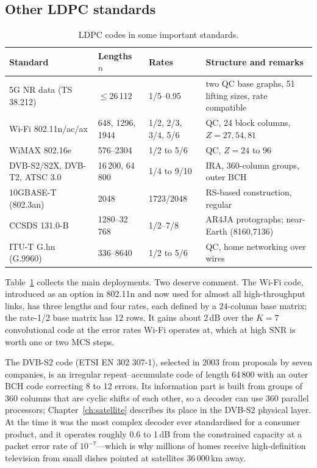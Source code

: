 \subsection{Other LDPC standards}

\begin{table}[htbp]\centering\small
\caption{LDPC codes in some important standards.}
\label{tab:ch15:ldpcstd}
\footnotesize
\begin{tabularx}{\linewidth}{@{}l l l >{\raggedright\arraybackslash}X@{}}
\toprule
Standard & Lengths $n$ & Rates & Structure and remarks\\
\midrule
5G NR data (TS 38.212) & $\le$26\,112 & 1/5--0.95 & two QC base graphs, 51 lifting sizes, rate compatible\\
Wi-Fi 802.11n/ac/ax & 648, 1296, 1944 & 1/2, 2/3, 3/4, 5/6 & QC, 24 block columns, $Z=27,54,81$\\
WiMAX 802.16e & 576--2304 & 1/2 to 5/6 & QC, $Z=24$ to 96\\
DVB-S2/S2X, DVB-T2, ATSC 3.0 & 16\,200, 64\,800 & 1/4 to 9/10 & IRA, 360-column groups, outer BCH\\
10GBASE-T (802.3an) & 2048 & 1723/2048 & RS-based construction, regular\\
CCSDS 131.0-B & 1280--32\,768 & 1/2--7/8 & AR4JA protographs; near-Earth (8160,7136)\\
ITU-T G.hn (G.9960) & 336--8640 & 1/2 to 5/6 & QC, home networking over wires\\
\bottomrule
\end{tabularx}
\end{table}

Table~\ref{tab:ch15:ldpcstd} collects the main deployments. Two deserve comment. The Wi-Fi code,
introduced as an option in 802.11n and now used for almost all high-throughput links, has three
lengths and four rates, each defined by a $24$-column base matrix; the rate-1/2 base matrix has 12
rows. It gains about 2\,dB over the $K=7$ convolutional code at the error rates Wi-Fi operates at,
which at high SNR is worth one or two MCS steps.

The DVB-S2 code (ETSI EN 302 307-1), selected in 2003 from proposals by seven companies, is an
irregular repeat--accumulate code of length 64\,800 with an outer BCH code correcting 8 to 12 errors.
Its information part is built from groups of 360 columns that are cyclic shifts of each other, so a
decoder can use 360 parallel processors; Chapter~\ref{ch:satellite} describes its place in the
DVB-S2 physical layer. At the time it was the most complex decoder ever standardised for a consumer
product, and it operates roughly 0.6 to 1\,dB from the constrained capacity at a packet error rate
of $10^{-7}$---which is why millions of homes receive high-definition television from small dishes
pointed at satellites 36\,000\,km away.

